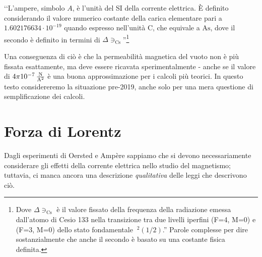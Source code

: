 \begin{center}
	‘‘L'ampere, simbolo $A$, è l'unità del SI della corrente elettrica. È definito considerando il valore numerico costante della carica elementare pari a $1.602176634\cdot10^{-19}$ quando espresso nell'unità $\unit{\coulomb}$, che equivale a $\unit{\ampere\second}$, dove il secondo è definito in termini di $\Delta \ni_{\textrm{Cs}}$''\footnote{Dove $\Delta \ni_{\textrm{Cs}}$ è il valore fissato della frequenza della radiazione emessa dall'atomo di Cesio 133 nella transizione tra due livelli iperfini (F=4, M=0) e (F=3, M=0) dello stato fondamentale $~^2(1/2)$.'' Parole complesse per dire sostanzialmente che anche il secondo è basato su una costante fisica definita.}
\end{center}
Una conseguenza di ciò è che la permeabilità magnetica del vuoto non è più fissata esattamente, ma deve essere ricavata sperimentalmente - anche se il valore di $4\pi \SI[per-mode = fraction]{d-7}{\newton\per\ampere\squared}$ è una buona approssimazione per i calcoli più teorici. In questo testo considereremo la situazione pre-2019, anche solo per una mera questione di semplificazione dei calcoli.
\section{Forza di Lorentz}
Dagli esperimenti di Oersted e Ampère sappiamo che si devono necessariamente considerare gli effetti della corrente elettrica nello studio del magnetismo; tuttavia, ci manca ancora una descrizione \textit{qualitativa} delle leggi che descrivono ciò.

